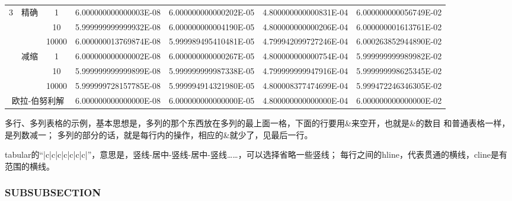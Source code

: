 \documentclass[UTF8,zihao=5]{ctexart} %
\begin{document}
\begin{table*}[htbp]
\begin{center}
\begin{tabular}{|c|c|c|c|c|c|c|}
            \multirow{6}{*}{3}                  & \multirow{3}{*}{精确} & 1                     & 6.000000000000003E-08 & 6.000000000000202E-05 & 4.800000000000831E-04 & 6.000000000056749E-02 \\
            \cline{3-7}
                                                &                       & 10                    & 5.999999999999932E-08 & 6.000000000004190E-05 & 4.800000000000206E-04 & 6.000000001613761E-02 \\
            \cline{3-7}
                                                &                       & 10000                 & 6.000000013769874E-08 & 5.999989495410481E-05 & 4.799942099727246E-04 & 6.000263852944890E-02 \\
            \cline{2-7}
                                                & \multirow{3}{*}{减缩} & 1                     & 6.000000000000002E-08 & 6.000000000000267E-05 & 4.800000000000754E-04 & 5.999999999989982E-02 \\
            \cline{3-7}
                                                &                       & 10                    & 5.999999999999899E-08 & 5.999999999987338E-05 & 4.799999999947916E-04 & 5.999999998625345E-02 \\
            \cline{3-7}
                                                &                       & 10000                 & 5.999999728157785E-08 & 5.999994914321980E-05 & 4.800008377474699E-04 & 5.999472246346305E-02 \\
            \hline

            \multicolumn{3}{|c|}{欧拉-伯努利解} & 6.000000000000000E-08 & 6.000000000000000E-05 & 4.800000000000000E-04 & 6.000000000000000E-02                                                 \\
            \hline
        \end{tabular}
    \end{center}
\end{table*}

多行、多列表格的示例，基本思想是，多列的那个东西放在多列的最上面一格，下面的行要用\&来空开，也就是\&的数目
和普通表格一样，是列数减一；
多列的部分的话，就是每行内的操作，相应的\&就少了，见最后一行。

tabular的“|c|c|c|c|c|c|c|”，意思是，竖线-居中-竖线-居中-竖线……，可以选择省略一些竖线；
每行之间的hline，代表贯通的横线，cline是有范围的横线。

\subsubsection{SUBSUBSECTION}
\end{document}
